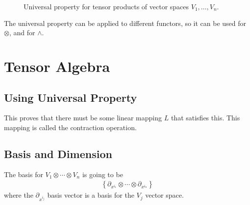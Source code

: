 \documentclass[10pt]{amsart}
\newcommand{\px}[1]{\partial_{x^{#1}}}
\newcommand{\R}{\mathbb{R}}
\newcommand{\tvs}{V_1\ox\cdots\ox V_n}
\newcommand{\x}{\times}
\renewcommand{\*}{\star}
\newcommand{\ox}{\otimes}
\begin{document}
\begin{figure}[htpb]
\begin{center}
\end{center}
\caption{Universal property for tensor products of vector spaces
         $V_1,\ldots,V_n$.}
\label{fig:universal_prop}
\end{figure}

The universal property can be applied to different functors, so it can be used
for $\ox$, and for $\wedge$.


\section{Tensor Algebra}%
\label{sec:tensor_algebra}

\subsection{Using Universal Property}%
\label{sub:using_universal_property}

\begin{center}
\end{center}

This proves that there must be some linear mapping $L$ that satisfies this.
This mapping is called the contraction operation.

\subsection{Basis and Dimension}%
\label{sub:basis_and_dimension}

The basis for $\tvs$ is going to be
\begin{align*}
  \left\{\px{i_1}\ox\cdots\ox\px{i_n}\right\}
\end{align*}
where the $\px{i_j}$ basis vector is a basis for the $V_j$ vector space.
\end{document}
